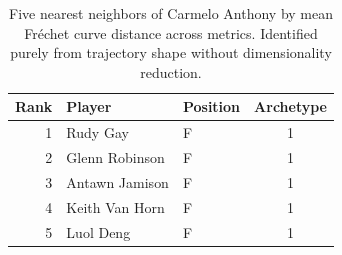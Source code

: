 \begin{table}[htbp]
  \centering\small
  \begin{tabular}{rllc}
    \toprule
    Rank & Player & Position & Archetype \\
    \midrule
    1 & Rudy Gay & F & 1 \\
    2 & Glenn Robinson & F & 1 \\
    3 & Antawn Jamison & F & 1 \\
    4 & Keith Van Horn & F & 1 \\
    5 & Luol Deng & F & 1 \\
    \bottomrule
  \end{tabular}
  \caption{Five nearest neighbors of Carmelo Anthony by mean Fr\'{e}chet curve distance across metrics. Identified purely from trajectory shape without dimensionality reduction.}
  \label{tab:Carmelo_Anthony_frechet_curve_neighbors}
\end{table}

